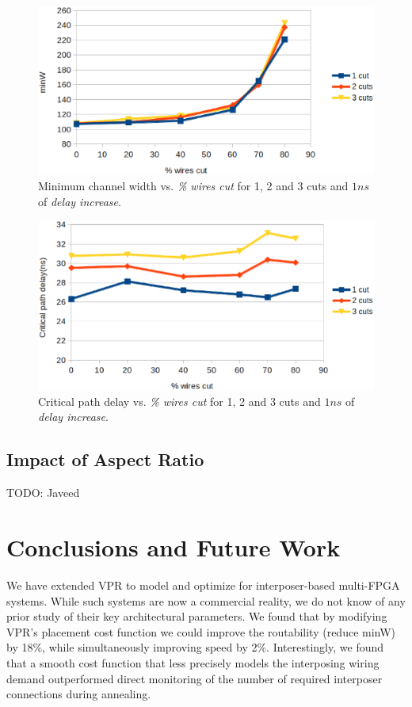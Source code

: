 \documentclass{sig-alternate-2013}
\begin{document}
\begin{figure}[!htbp]
\centering
\includegraphics[width=\linewidth]{cuts_minW.eps}
\caption{Minimum channel width vs. \textit{\% wires cut} for 1, 2 and 3 cuts and $1ns$ of \textit{delay increase}.}
\label{fig:cuts_minW}
\end{figure}

\begin{figure}[!htbp]
\centering
\includegraphics[width=\linewidth]{cuts_crit_path.eps}
\caption{Critical path delay vs. \textit{\% wires cut} for 1, 2 and 3 cuts and $1ns$ of \textit{delay increase}.}
\label{fig:cuts_crit}
\end{figure}


\subsection{Impact of Aspect Ratio}
\label{aspect_ratio_impact}
TODO: Javeed

\section{Conclusions and Future Work}
\label{conclusionSection}
We have extended VPR to model and optimize for interposer-based multi-FPGA systems. While such systems are now a commercial reality, we do not know of any prior study of their key architectural parameters. We found that by modifying VPR's placement cost function we could improve the routability (reduce minW) by 18\%, while simultaneously improving speed by 2\%. Interestingly, we found that a smooth cost function that less precisely models the interposing wiring demand outperformed direct monitoring of the number of required interposer connections during annealing.
\end{document}
